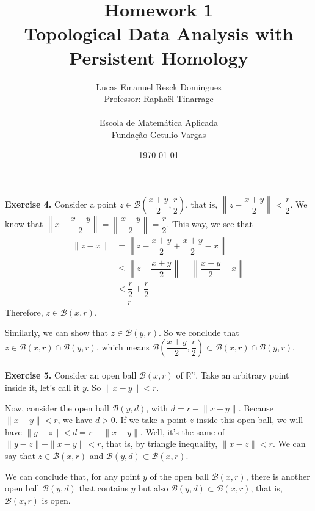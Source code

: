 \documentclass{article}
\title{Homework 1\\
    \large{Topological Data Analysis with Persistent Homology}}
\author{Lucas Emanuel Resck Domingues\\    
    Professor: Raphaël Tinarrage\\\\
    {Escola de Matemática Aplicada}\\
    {Fundação Getulio Vargas}}
\date{\today}
\begin{document}
    \maketitle

    \noindent\textbf{Exercise 4.} Consider a point $z \in \mathcal{B}\left(\dfrac{x+y}{2}, \dfrac{r}{2}\right)$, that is, $\left\lVert z - \dfrac{x+y}{2}\right\lVert < \dfrac{r}{2}$.
    We know that $\left\lVert x - \dfrac{x+y}{2}\right\lVert = \left\lVert\dfrac{x-y}{2} \right\lVert = \dfrac{r}{2}$. This way, we see that
    \begin{align*}
        \lVert z - x \lVert &= \left\lVert z - \dfrac{x+y}{2} + \dfrac{x+y}{2} - x \right\lVert\\
        &\le \left\lVert z - \dfrac{x+y}{2}\right\lVert + \left\lVert \dfrac{x+y}{2} - x \right\lVert\\
        &< \dfrac{r}{2} + \dfrac{r}{2}\\
        &= r
    \end{align*}
    Therefore, $z \in \mathcal{B}(x, r)$.
    
    Similarly, we can show that $z \in \mathcal{B}(y, r)$. So we conclude that $z \in \mathcal{B}(x, r) \cap \mathcal{B}(y, r)$, which means $\mathcal{B}\left(\dfrac{x+y}{2}, \dfrac{r}{2}\right) \subset \mathcal{B}(x, r) \cap \mathcal{B}(y, r)$.\\\\

    \noindent\textbf{Exercise 5.} Consider an open ball $\mathcal{B}(x, r)$ of $\mathbb{R}^n$.
    Take an arbitrary point inside it, let's call it $y$.
    So $\lVert x - y \lVert < r$.
    
    Now, consider the open ball $\mathcal{B}(y, d)$, with $d = r - \lVert x - y \lVert$.
    Because $\lVert x - y \lVert < r$, we have $d > 0$.
    If we take a point $z$ inside this open ball, we will have $\lVert y - z \lVert < d = r - \lVert x - y \lVert$.
    Well, it's the same of $\lVert y - z \lVert + \lVert x - y \lVert < r$, that is, by triangle inequality, $\lVert x - z \lVert < r$.
    We can say that $z \in \mathcal{B}(x, r)$ and $\mathcal{B}(y, d) \subset \mathcal{B}(x, r)$.
    
    We can conclude that, for any point $y$ of the open ball $\mathcal{B}(x, r)$, there is another open ball $\mathcal{B}(y, d)$ that contains $y$ but also $\mathcal{B}(y, d) \subset \mathcal{B}(x, r)$, that is, $\mathcal{B}(x, r)$ is open.
\end{document}
